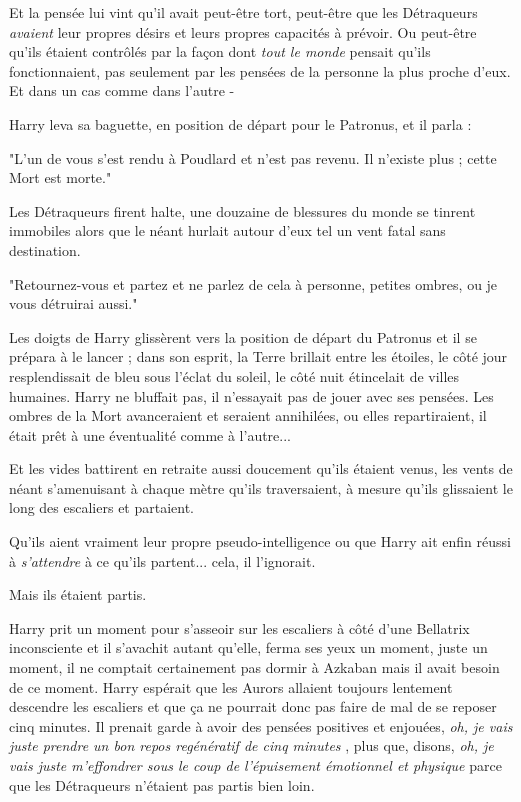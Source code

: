 Et la pensée lui vint qu'il avait peut-être tort, peut-être que les Détraqueurs \emph{avaient}  leur propres désirs et leurs propres capacités à prévoir. Ou peut-être qu'ils étaient contrôlés par la façon dont \emph{tout le monde } pensait qu'ils fonctionnaient, pas seulement par les pensées de la personne la plus proche d'eux. Et dans un cas comme dans l'autre -

Harry leva sa baguette, en position de départ pour le Patronus, et il parla :

"L'un de vous s'est rendu à Poudlard et n'est pas revenu. Il n'existe plus ; cette Mort est morte."

Les Détraqueurs firent halte, une douzaine de blessures du monde se tinrent immobiles alors que le néant hurlait autour d'eux tel un vent fatal sans destination.

"Retournez-vous et partez et ne parlez de cela à personne, petites ombres, ou je vous détruirai aussi."

Les doigts de Harry glissèrent vers la position de départ du Patronus et il se prépara à le lancer ; dans son esprit, la Terre brillait entre les étoiles, le côté jour resplendissait de bleu sous l'éclat du soleil, le côté nuit étincelait de villes humaines. Harry ne bluffait pas, il n'essayait pas de jouer avec ses pensées. Les ombres de la Mort avanceraient et seraient annihilées, ou elles repartiraient, il était prêt à une éventualité comme à l'autre...

Et les vides battirent en retraite aussi doucement qu'ils étaient venus, les vents de néant s'amenuisant à chaque mètre qu'ils traversaient, à mesure qu'ils glissaient le long des escaliers et partaient.

Qu'ils aient vraiment leur propre pseudo-intelligence ou que Harry ait enfin réussi à \emph{s'attendre}  à ce qu'ils partent... cela, il l'ignorait.

Mais ils étaient partis.

Harry prit un moment pour s'asseoir sur les escaliers à côté d'une Bellatrix inconsciente et il s'avachit autant qu'elle, ferma ses yeux un moment, juste un moment, il ne comptait certainement pas dormir à Azkaban mais il avait besoin de ce moment. Harry espérait que les Aurors allaient toujours lentement descendre les escaliers et que ça ne pourrait donc pas faire de mal de se reposer cinq minutes. Il prenait garde à avoir des pensées positives et enjouées, \emph{oh, je vais juste prendre un bon repos regénératif de cinq minutes} , plus que, disons, \emph{oh, je vais juste m'effondrer sous le coup de l'épuisement émotionnel et physique}  parce que les Détraqueurs n'étaient pas partis bien loin.

